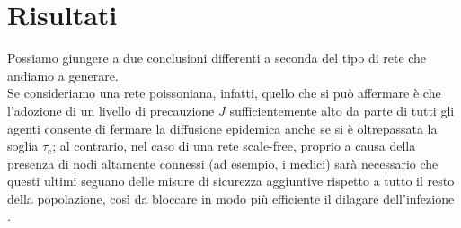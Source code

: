 \section{Risultati}
Possiamo giungere a due conclusioni differenti a seconda del tipo di rete che andiamo a generare. \\Se consideriamo una rete poissoniana, infatti, quello che si può affermare è che l'adozione di un livello di precauzione $ J $ sufficientemente alto da parte di tutti gli agenti consente di fermare la diffusione epidemica anche se si è oltrepassata la soglia $ \tau_c $; al contrario, nel caso di una rete scale-free, proprio a causa della presenza di nodi altamente connessi (ad esempio, i medici) sarà necessario che questi ultimi seguano delle misure di sicurezza aggiuntive rispetto a tutto il resto della popolazione, così da bloccare in modo più efficiente il dilagare dell'infezione \cite{Bagnoli2007}.